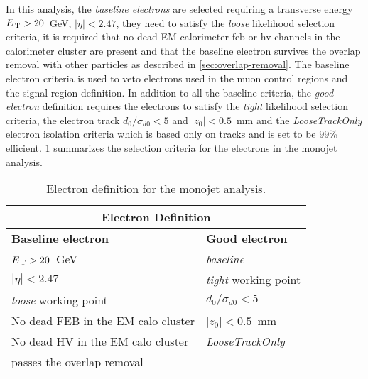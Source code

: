 In this analysis, the \emph{baseline electrons} are selected requiring a
transverse energy $E_\mathrm{\, T} > 20$~GeV, $|\eta| < 2.47$, they need to satisfy the
\emph{loose} likelihood selection criteria, it is required that no dead EM
calorimeter \gls{feb} or \gls{hv} channels in the calorimeter cluster are
present and that the baseline electron survives the overlap removal with other
particles as described in \cref{sec:overlap-removal}. The baseline electron
criteria is used to veto electrons used in the muon control regions and the
signal region definition. In addition to all the baseline criteria, the
\emph{good electron} definition requires the electrons to satisfy the
\emph{tight} likelihood selection criteria, the electron track
$d_0 / \sigma_{d0} < 5$ and $|z_0| < 0.5$~mm and the \emph{LooseTrackOnly}
electron isolation criteria which is based only on tracks and is set to be 99\%
efficient. \cref{tab:ele_def} summarizes the selection criteria for the
electrons in the monojet analysis.
\begin{table}[!htb]
  \centering
  \begin{tabular}{ll}
    \toprule
    \multicolumn{2}{c}{Electron Definition} \\
    \midrule \midrule
    \textbf{Baseline electron} & \textbf{Good electron} \\
    \midrule
    $E_\mathrm{\, T} > 20$~GeV & \emph{baseline} \\
    $|\eta| < 2.47$ & \emph{tight} working point \\
    \emph{loose} working point & $d_0 / \sigma_{d0} < 5$ \\
    No dead FEB in the EM calo cluster & $|z_0| < 0.5$~mm \\
    No dead HV in the EM calo cluster & \emph{LooseTrackOnly} \\
    passes the overlap removal & \\
    \bottomrule
  \end{tabular}
  \caption{Electron definition for the monojet analysis.}
  \label{tab:ele_def}
\end{table}
